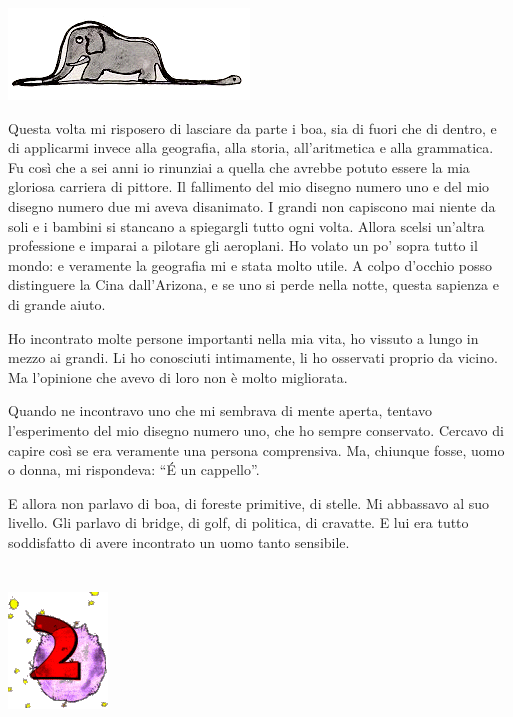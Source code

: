 \documentclass[11pt]{scrbook}
\begin{document}
\begin{center}
\includegraphics{img/boa}
\end{center}

Questa volta mi risposero di lasciare da parte i boa, sia di fuori che
di dentro, e di applicarmi invece alla geografia, alla storia,
all'aritmetica e alla grammatica. Fu così che a sei anni io rinunziai a
quella che avrebbe potuto essere la mia gloriosa carriera di pittore. Il
fallimento del mio disegno numero uno e del mio disegno numero due mi
aveva disanimato. I grandi non capiscono mai niente da soli e i bambini
si stancano a spiegargli tutto ogni volta. Allora scelsi un'altra
professione e imparai a pilotare gli aeroplani. Ho volato un po' sopra
tutto il mondo: e veramente la geografia mi e stata molto utile. A colpo
d'occhio posso distinguere la Cina dall'Arizona, e se uno si perde nella
notte, questa sapienza e di grande aiuto.

Ho incontrato molte persone importanti nella mia vita, ho vissuto a
lungo in mezzo ai grandi. Li ho conosciuti intimamente, li ho osservati
proprio da vicino. Ma l'opinione che avevo di loro non è molto
migliorata.

Quando ne incontravo uno che mi sembrava di mente aperta, tentavo
l'esperimento del mio disegno numero uno, che ho sempre conservato.
Cercavo di capire così se era veramente una persona comprensiva. Ma,
chiunque fosse, uomo o donna, mi rispondeva: ``É un cappello''.

E allora non parlavo di boa, di foreste primitive, di stelle. Mi
abbassavo al suo livello. Gli parlavo di bridge, di golf, di politica,
di cravatte. E lui era tutto soddisfatto di avere incontrato un uomo
tanto sensibile.

\chapter{}
\begin{center}
\includegraphics{img/chapter2}
\end{center}
\end{document}

